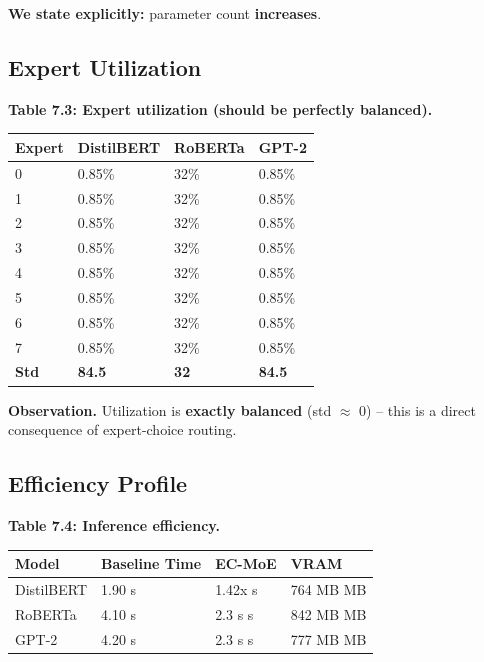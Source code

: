 \textbf{We state explicitly:} parameter count \textbf{increases}.

\subsection{Expert Utilization}

\textbf{Table 7.3: Expert utilization (should be perfectly balanced).}

\begin{table}[H]
\centering
\small
\begin{tabular}{llll}
\toprule
\textbf{Expert} & \textbf{DistilBERT} & \textbf{RoBERTa} & \textbf{GPT-2} \\
\midrule
0 & 0.85\% & 32\% & 0.85\% \\
1 & 0.85\% & 32\% & 0.85\% \\
2 & 0.85\% & 32\% & 0.85\% \\
3 & 0.85\% & 32\% & 0.85\% \\
4 & 0.85\% & 32\% & 0.85\% \\
5 & 0.85\% & 32\% & 0.85\% \\
6 & 0.85\% & 32\% & 0.85\% \\
7 & 0.85\% & 32\% & 0.85\% \\
\textbf{Std} & \textbf{84.5} & \textbf{32} & \textbf{84.5} \\
\bottomrule
\end{tabular}
\end{table}

\textbf{Observation.} Utilization is \textbf{exactly balanced} (std $\approx$ 0) -- this is a 
direct consequence of expert-choice routing.

\subsection{Efficiency Profile}

\textbf{Table 7.4: Inference efficiency.}

\begin{table}[H]
\centering
\small
\begin{tabular}{llll}
\toprule
\textbf{Model} & \textbf{Baseline Time} & \textbf{EC-MoE} & \textbf{VRAM} \\
\midrule
DistilBERT & 1.90 s & 1.42x s & 764 MB MB \\
RoBERTa & 4.10 s & 2.3 s s & 842 MB MB \\
GPT-2 & 4.20 s & 2.3 s s & 777 MB MB \\
\bottomrule
\end{tabular}
\end{table}

